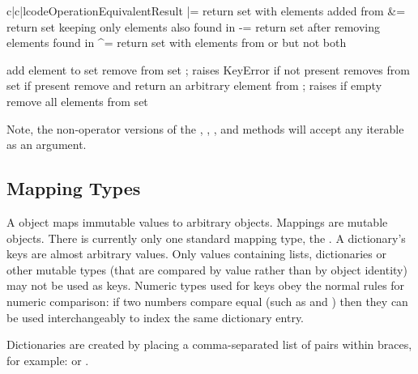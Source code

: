 \begin{tableiii}{c|c|l}{code}{Operation}{Equivalent}{Result}
         { |= }
         {return set  with elements added from }
         { \&= }
         {return set  keeping only elements also found in }
         { -= }
         {return set  after removing elements found in }
         { \textasciicircum= }
         {return set  with elements from  or 
          but not both}

  \hline
         {add element  to set }
         {remove  from set ; raises KeyError if not present}
         {removes  from set  if present}
         {remove and return an arbitrary element from ; raises
	   if empty}
         {remove all elements from set }
\end{tableiii}

Note, the non-operator versions of the ,
, , and
 methods will accept any iterable
as an argument.


\subsection{Mapping Types \label{typesmapping}}

A  object maps  immutable values to
arbitrary objects.  Mappings are mutable objects.  There is currently
only one standard mapping type, the .  A dictionary's keys are
almost arbitrary values.  Only values containing lists, dictionaries
or other mutable types (that are compared by value rather than by
object identity) may not be used as keys.
Numeric types used for keys obey the normal rules for numeric
comparison: if two numbers compare equal (such as  and
) then they can be used interchangeably to index the same
dictionary entry.

Dictionaries are created by placing a comma-separated list of
 pairs within braces, for example:
 or
.

